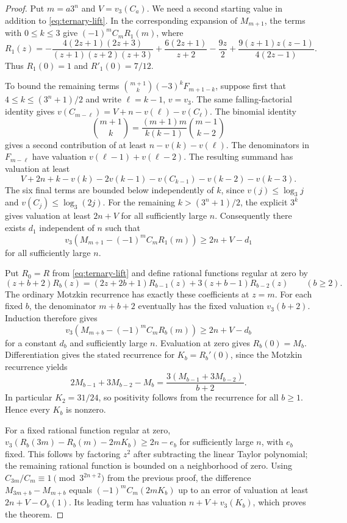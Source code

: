 \documentclass[11pt,a4paper]{article}
\begin{document}
\begin{proof}
Put $m=a3^n$ and $V=v_3(C_a)$. We need a second starting value in
addition to \eqref{eq:ternary-lift}. In the corresponding expansion
of $M_{m+1}$, the terms with $0\le k\le3$ give
$(-1)^m C_m R_1(m)$, where
\[
 R_1(z)=-\frac{4(2z+1)(2z+3)}{(z+1)(z+2)(z+3)}
       +\frac{6(2z+1)}{z+2}-\frac{9z}{2}
       +\frac{9(z+1)z(z-1)}{4(2z-1)}.
\]
Thus $R_1(0)=1$ and $R'_1(0)=7/12$.

To bound the remaining terms $\binom{m+1}{k}(-3)^k F_{m+1-k}$,
suppose first that $4\le k\le(3^n+1)/2$
and write $\ell=k-1$, $v=v_3$. The same falling-factorial identity gives
$v(C_{m-\ell})=V+n-v(\ell)-v(C_\ell)$. The binomial identity
\[
 \binom{m+1}k=\frac{(m+1)m}{k(k-1)}\binom{m-1}{k-2}
\]
gives a second contribution of at least $n-v(k)-v(\ell)$.
The denominators in $F_{m-\ell}$ have valuation
$v(\ell-1)+v(\ell-2)$. The resulting summand has valuation at least
\[
 V+2n+k-v(k)-2v(k-1)-v(C_{k-1})-v(k-2)-v(k-3).
\]
The six final terms are bounded below independently of $k$, since
$v(j)\le\log_3 j$ and $v(C_j)\le\log_3(2j)$. For the remaining
$k>(3^n+1)/2$, the explicit $3^k$ gives valuation at least $2n+V$
for all sufficiently large $n$. Consequently there exists $d_1$
independent of $n$ such that
\[
 v_3(M_{m+1}-(-1)^m C_m R_1(m))\ge 2n+V-d_1
\]
for all sufficiently large $n$.

Put $R_0=R$ from \eqref{eq:ternary-lift} and define rational
functions regular at zero by
\[
 (z+b+2)R_b(z)=(2z+2b+1)R_{b-1}(z)+3(z+b-1)R_{b-2}(z)
 \qquad(b\ge2).
\]
The ordinary Motzkin recurrence has exactly these coefficients at $z=m$.
For each fixed $b$, the denominator $m+b+2$ eventually has the fixed
valuation $v_3(b+2)$. Induction therefore gives
\[
 v_3(M_{m+b}-(-1)^m C_m R_b(m))\ge2n+V-d_b
\]
for a constant $d_b$ and sufficiently large $n$.
Evaluation at zero gives $R_b(0)=M_b$. Differentiation gives the
stated recurrence for $K_b=R_b'(0)$, since the Motzkin recurrence
yields
\[
 2M_{b-1}+3M_{b-2}-M_b=\frac{3(M_{b-1}+3M_{b-2})}{b+2}.
\]
In particular $K_2=31/24$, so positivity follows from the recurrence
for all $b\ge1$. Hence every $K_b$ is nonzero.

For a fixed rational function regular at zero,
$v_3(R_b(3m)-R_b(m)-2mK_b)\ge2n-e_b$ for sufficiently large $n$,
with $e_b$ fixed. This follows by factoring $z^2$ after
subtracting the linear Taylor polynomial; the remaining rational
function is bounded on a neighborhood of zero. Using
$C_{3m}/C_m\equiv1\pmod{3^{2n+2}}$ from the previous proof,
the difference $M_{3m+b}-M_{m+b}$ equals
$(-1)^m C_m(2mK_b)$ up to an error of valuation at least
$2n+V-O_b(1)$. Its leading term has valuation $n+V+v_3(K_b)$,
which proves the theorem.
\end{proof}
\end{document}
